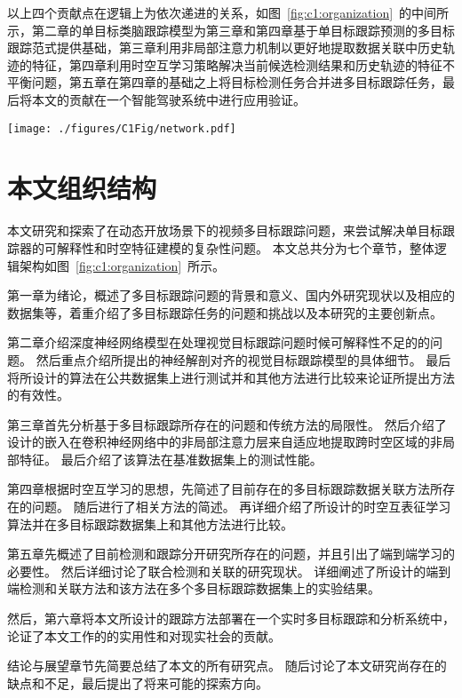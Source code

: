 以上四个贡献点在逻辑上为依次递进的关系，如图~\ref{fig:c1:organization}~的中间所示，第二章的单目标类脑跟踪模型为第三章和第四章基于单目标跟踪预测的多目标跟踪范式提供基础，第三章利用非局部注意力机制以更好地提取数据关联中历史轨迹的特征，第四章利用时空互学习策略解决当前候选检测结果和历史轨迹的特征不平衡问题，第五章在第四章的基础之上将目标检测任务合并进多目标跟踪任务，最后将本文的贡献在一个智能驾驶系统中进行应用验证。



\begin{figure*}[ht]
	\centering
	\texttt{[image: ./figures/C1Fig/network.pdf]}
	\caption{本文组织结构}
	\label{fig:c1:organization}
\end{figure*}

\section{本文组织结构}
本文研究和探索了在动态开放场景下的视频多目标跟踪问题，来尝试解决单目标跟踪器的可解释性和时空特征建模的复杂性问题。
本文总共分为七个章节，整体逻辑架构如图~\ref{fig:c1:organization}~所示。


第一章为绪论，概述了多目标跟踪问题的背景和意义、国内外研究现状以及相应的数据集等，着重介绍了多目标跟踪任务的问题和挑战以及本研究的主要创新点。

第二章介绍深度神经网络模型在处理视觉目标跟踪问题时候可解释性不足的的问题。
然后重点介绍所提出的神经解剖对齐的视觉目标跟踪模型的具体细节。
最后将所设计的算法在公共数据集上进行测试并和其他方法进行比较来论证所提出方法的有效性。

第三章首先分析基于多目标跟踪所存在的问题和传统方法的局限性。
然后介绍了设计的嵌入在卷积神经网络中的非局部注意力层来自适应地提取跨时空区域的非局部特征。
最后介绍了该算法在基准数据集上的测试性能。

第四章根据时空互学习的思想，先简述了目前存在的多目标跟踪数据关联方法所存在的问题。
随后进行了相关方法的简述。
再详细介绍了所设计的时空互表征学习算法并在多目标跟踪数据集上和其他方法进行比较。

第五章先概述了目前检测和跟踪分开研究所存在的问题，并且引出了端到端学习的必要性。
然后详细讨论了联合检测和关联的研究现状。
详细阐述了所设计的端到端检测和关联方法和该方法在多个多目标跟踪数据集上的实验结果。

然后，第六章将本文所设计的跟踪方法部署在一个实时多目标跟踪和分析系统中，论证了本文工作的的实用性和对现实社会的贡献。

结论与展望章节先简要总结了本文的所有研究点。
随后讨论了本文研究尚存在的缺点和不足，最后提出了将来可能的探索方向。



